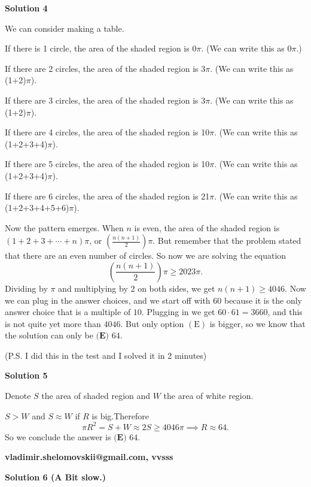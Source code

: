 \begin{enumerate}
 



\textbf{Solution 4}

We can consider making a table.

 If there is 1 circle, the area of the shaded region is 0$\pi$. (We can write this as 0$\pi$.)

 If there are 2 circles, the area of the shaded region is 3$\pi$.  (We can write this as (1+2)$\pi$).

 If there are 3 circles, the area of the shaded region is 3$\pi$.  (We can write this as (1+2)$\pi$).

 If there are 4 circles, the area of the shaded region is 10$\pi$.  (We can write this as (1+2+3+4)$\pi$).

 If there are 5 circles, the area of the shaded region is 10$\pi$.  (We can write this as (1+2+3+4)$\pi$).

 If there are 6 circles, the area of the shaded region is 21$\pi$.  (We can write this as (1+2+3+4+5+6)$\pi$).

 Now the pattern emerges. When $n$ is even, the area of the shaded region is $(1+2+3+\cdots+n)\pi$, or $\left( \frac{n(n+1)}{2} \right) \pi$. But remember that the problem stated that there are an even number of circles. So now we are solving the equation 
 \[\left( \frac{n(n+1)}{2} \right) \pi\ge2023\pi.\] Dividing by $\pi$ and multiplying by 2 on both sides, we get $n(n+1)\ge4046$. Now we can plug in the answer choices, and we start off with $60$ because it is the only answer choice that is a multiple of $10$. Plugging in we get $60\cdot61=3660$, and this is not quite yet more than $4046$. But only option $(\text{E})$ is bigger, so we know that the solution can only be $\boxed{\textbf{(E) } 64}$.

 (P.S. I did this in the test and I solved it in 2 minutes)

 



\textbf{Solution 5}

Denote $S$ the area of shaded region and $W$ the area of white region.

 $S > W$ and $S \approx W$ if $R$ is big.Therefore 
 \[\pi R^2 = S + W \approx 2S \ge 4046 \pi \implies R \approx 64.\]So we conclude the answer is $\boxed{\textbf{(E) } 64}$.

 \textbf{vladimir.shelomovskii@gmail.com, vvsss}

 



\textbf{Solution 6 (A Bit slow.)}


\end{enumerate}
